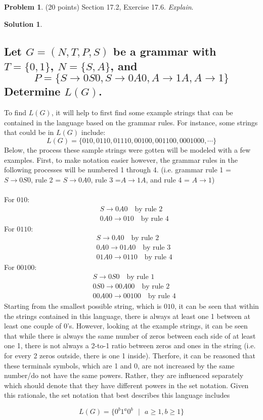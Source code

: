 \documentclass{article}
\theoremstyle{definition}
\newtheorem{problem}{Problem}
\newtheorem*{solution}{Solution}
\begin{document}
\newpage
\begin{problem} (20 points) Section 17.2, Exercise 17.6.  \textit{Explain}.
\end{problem}
\begin{solution}
\hspace{1cm}
\subsection*{Let $G = (N, T, P, S)$ be a grammar with $T = \{0, 1\}$, $N = \{S, A\}$, and $$P = \{S \rightarrow 0S0, S \rightarrow 0A0, A \rightarrow 1A, A \rightarrow 1\}$$
Determine $L(G)$.}
To find $L(G)$, it will help to first find some example strings that can be contained in the language based on the grammar rules. For instance, some strings that could be in $L(G)$ include:
$$ L(G) = \{010,0110,01110,00100,001100,0001000,\cdots \} $$
Below, the process these sample strings were gotten will be modeled with a few examples. First, to make notation easier however, the grammar rules in the following processes will be numbered 1 through 4. (i.e. grammar rule 1 = $S \rightarrow 0S0$, rule 2 = $S \rightarrow 0A0$, rule 3 =$A \rightarrow 1A$, and rule 4 = $A \rightarrow 1$)\\\\
For $010$:
\begin{align*}
&S \rightarrow 0A0 \quad \mbox{by rule 2}\\
&0A0 \rightarrow 010 \quad \mbox{by rule 4}
\end{align*}
For $0110$:
\begin{align*}
&S \rightarrow 0A0  \quad \mbox{by rule 2}\\
&0A0 \rightarrow 01A0  \quad \mbox{by rule 3}\\
&01A0 \rightarrow 0110  \quad \mbox{by rule 4}
\end{align*}
For $00100$:
\begin{align*}
&S \rightarrow 0S0  \quad \mbox{by rule 1}\\
&0S0 \rightarrow 00A00  \quad \mbox{by rule 2}\\
&00A00 \rightarrow 00100  \quad \mbox{by rule 4}
\end{align*}
Starting from the smallest possible string, which is $010$, it can be seen that within the strings contained in this language, there is always at least one 1 between at least one couple of 0's. However, looking at the example strings, it can be seen that while there is always the same number of zeros between each side of at least one 1, there is not always a 2-to-1 ratio between zeros and ones in the string (i.e. for every 2 zeros outside, there is one 1 inside). Therfore, it can be reasoned that these terminals symbols, which are 1 and 0, are not increased by the same number/do not have the same powers. Rather, they are influenced separately which should denote that they have different powers in the set notation. Given this rationale, the set notation that best describes this language includes

$$ L(G) = \{ 0^b1^a0^b\mbox{ } | \mbox{ } a \geqslant 1, b \geqslant 1 \} $$
\end{solution}
\end{document}
